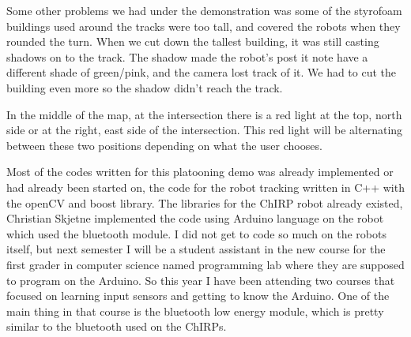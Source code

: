 Some other problems we had under the demonstration was some of the styrofoam buildings used around the tracks were too tall, and covered the robots when they rounded the turn. When we cut down the tallest building, it was still casting shadows on to the track. The shadow made the robot's post it note have a different shade of green/pink, and the camera lost track of it. We had to cut the building even more so the shadow didn't reach the track.


In the middle of the map, at the intersection there is a red light at the top, north side or at the right, east side of the intersection. This red light will be alternating between these two positions depending on what the user chooses. 

Most of the codes written for this platooning demo was already implemented or had already been started on, the code for the robot tracking written in C++ with the openCV and boost library. The libraries for the ChIRP robot already existed, Christian Skjetne implemented the code using Arduino language on the robot which used the bluetooth module. 
I did not get to code so much on the robots itself, but next semester I will be a student assistant in the new course for the first grader in computer science named programming lab where they are supposed to program on the Arduino. So this year I have been attending two courses that focused on learning input sensors and getting to know the Arduino. One of the main thing in that course is the bluetooth low energy module, which is pretty similar to the bluetooth used on the ChIRPs. 
